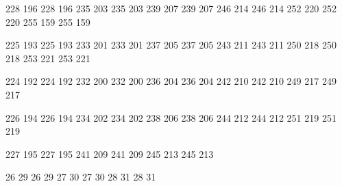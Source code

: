 

\startmapping[texnansi] 

 228 196  228 196  
 235 203  235 203
 239 207  239 207
 246 214  246 214
 252 220  252 220
 255 159  255 159

 225 193  225 193
 233 201  233 201
 237 205  237 205
 243 211  243 211
 250 218  250 218
 253 221  253 221

 224 192  224 192
 232 200  232 200
 236 204  236 204
 242 210  242 210
 249 217  249 217

 226 194  226 194
 234 202  234 202
 238 206  238 206
 244 212  244 212
 251 219  251 219

 227 195  227 195
 241 209  241 209
 245 213  245 213


  26  29   26  29 
  27  30   27  30 
  28  31   28  31 

\stopmapping

\startencoding[texnansi]

